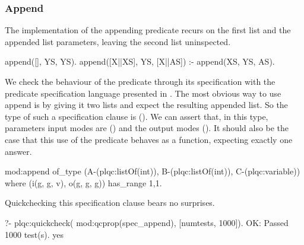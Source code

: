 
\subsubsection{Append}
The implementation of the appending predicate recurs on the first list
and the appended list parameters, leaving the second list uninspected.
%
\begin{yapcode}
 append([], YS, YS).
 append([X||XS], YS, [X||AS]) :-
   append(XS, YS, AS).
\end{yapcode}
%
We check the behaviour of the  predicate
through its specification with the predicate specification language
presented in .
%
The most obvious way to use append is by giving it two lists and expect
the resulting appended list.
%
So the type of such a specification clause is
().
%
We can assert that, in this \plqc{} type, parameters input modes are
() and the output modes ().
%
It should also be the case that this use of the predicate behaves as a
function, expecting exactly one answer.
%
\begin{yapcode}
 mod:append
   of_type (A-(plqc:listOf(int)),
     B-(plqc:listOf(int)), C-(plqc:variable))
   where (i(g, g, v), o(g, g, g))
   has_range {1,1}.
\end{yapcode}
%
Quickchecking this specification clause bears no surprises.
%
\begin{yapcode}
   ?- plqc:quickcheck(
        mod:qcprop(spec_append),
        [{numtests, 1000}]).
 OK: Passed 1000 test(s).
 yes
\end{yapcode}



